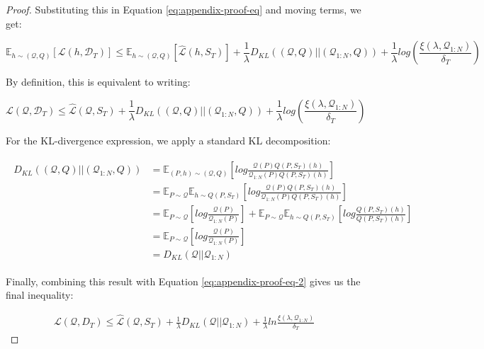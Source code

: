 \documentclass{article}
\theoremstyle{definition}
\newcommand{\Expect}[2]{\mathbb{E}_{#1}\left [#2 \right ]}
\begin{document}
\begin{proof}
	Substituting this in Equation \ref{eq:appendix-proof-eq} and moving terms, we get:
	
	\begin{equation} 
	\Expect{h\sim (\mathcal{Q}, Q)}{\mathcal{L}(h,\mathcal{D}_T)} \leq \Expect{h\sim (\mathcal{Q}, Q)}{\hat{\mathcal{L}}(h,S_T)} +\frac{1}{\lambda} D_{KL}((\mathcal{Q}, Q)||(\mathcal{Q}_{1:N}, Q))+\frac{1}{\lambda}log\left (\frac{\xi(\lambda,\mathcal{Q}_{1:N})}{\delta_T}\right )
	\end{equation}
	
	By definition, this is equivalent to writing:
	
	\begin{equation} \label{eq:appendix-proof-eq-2}
	\mathcal{L}(\mathcal{Q},\mathcal{D}_T) \leq \hat{\mathcal{L}}(\mathcal{Q},S_T) +\frac{1}{\lambda} D_{KL}((\mathcal{Q}, Q)||(\mathcal{Q}_{1:N}, Q))+\frac{1}{\lambda}log\left (\frac{\xi(\lambda,\mathcal{Q}_{1:N})}{\delta_T}\right )
	\end{equation}
	
	For the KL-divergence expression, we apply a standard KL decomposition:
	
	\begin{align*}
	\begin{split}
	D_{KL}((\mathcal{Q}, Q)||(\mathcal{Q}_{1:N}, Q))&=\Expect{(P,h)\sim (\mathcal{Q},Q)}{log\frac{\mathcal{Q}(P)Q(P, S_T)(h)}{\mathcal{Q}_{1:N}(P)Q(P, S_T)(h)}}\\
	&=\mathbb{E}_{P\sim \mathcal{Q}}\Expect{h\sim Q(P,S_T)}{log\frac{\mathcal{Q}(P)Q(P, S_T)(h)}{\mathcal{Q}_{1:N}(P)Q(P, S_T)(h)}}\\
	&=\Expect{P\sim \mathcal{Q}}{log\frac{\mathcal{Q}(P)}{\mathcal{Q}_{1:N}(P)}}+\mathbb{E}_{P\sim \mathcal{Q}}\Expect{h\sim Q(P,S_T)}{log\frac{Q(P, S_T)(h)}{Q(P, S_T)(h)}}\\
	&=\Expect{P\sim \mathcal{Q}}{log\frac{\mathcal{Q}(P)}{\mathcal{Q}_{1:N}(P)}}\\
	&=D_{KL}(\mathcal{Q}||\mathcal{Q}_{1:N})
	\end{split}
	\end{align*}
	
	Finally, combining this result with Equation \ref{eq:appendix-proof-eq-2} gives us the final inequality:
	
	\begin{align*}
	\mathcal{L}(\mathcal{Q}, D_T) \leq \hat{\mathcal{L}}(\mathcal{Q}, S_T) + \frac{1}{\lambda}D_{KL}(\mathcal{Q}||\mathcal{Q}_{1:N})
	+\frac{1}{\lambda}ln\frac{\xi(\lambda,\mathcal{Q}_{1:N})}{\delta_T}
	\end{align*}

\end{proof}
\end{document}
